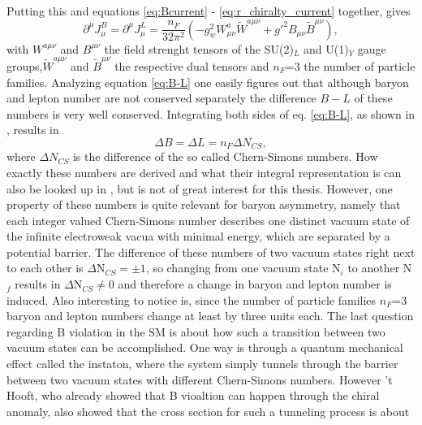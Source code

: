 Putting this and equations \eqref{eq:Bcurrent} - \eqref{eq:r_chiralty_current} together, gives
\begin{equation}
\partial^\mu J_\mu^B=\partial^\mu J_\mu^L=\frac{n_F}{32\pi^2}\left(-g_w^2W^a_{\mu\nu}\tilde{W}^{a\mu\nu}+g'^2B_{\mu\nu}\tilde{B}^{\mu\nu}\right),
\label{eq:B-L}
\end{equation}
with $W^{a\mu\nu}$ and $B^{\mu\nu}$ the field strenght tensors of the SU(2)$_L$ and U(1)$_Y$ gauge groups,$\tilde{W}^{a\mu\nu}$ and $\tilde{B}^{\mu\nu}$ the respective dual tensors and $n_F$=3 the number of particle families. \newline\indent
Analyzing equation \eqref{eq:B-L} one easily figures out that although baryon and lepton number are not conserved separately the difference $B-L$ of these numbers is very well conserved.
Integrating both sides of eq. \eqref{eq:B-L}, as shown in \cite[pp. 15f.]{Bernreuther:2002uj}, results in 
\begin{equation}
	\Delta B=\Delta L=n_F\Delta N_{CS},
	\label{eq:number_change}
\end{equation}
where $\Delta N_{CS}$ is the difference of the so called Chern-Simons numbers. How exactly these numbers are derived and what their integral representation is can also be looked up in \cite{Cline:2006ts,Petropoulos:2003pm,Bernreuther:2002uj}, but is not of great interest for this thesis. However, one property of these numbers is quite relevant for baryon asymmetry, namely that each integer valued Chern-Simons number describes one distinct vacuum state of the infinite electroweak vacua with minimal energy, which are separated by a potential barrier. The difference of these numbers of two vacuum states right next to each other is $\Delta$N$_{CS}=\pm1$, so changing from one vacuum state N$_i$ to another N$_f$ results in $\Delta$N$_{CS}\neq0$ and therefore a change in baryon and lepton number is induced. Also interesting to notice is, since the number of particle families $n_F$=3 baryon and lepton numbers change at least by three units each. \newline\indent
The last question regarding B violation in the SM is about how such a transition between two vacuum states can be accomplished. One way is through a quantum mechanical effect called the instaton, where the system simply tunnels through the barrier between two vacuum states with different Chern-Simons numbers. However 't Hooft, who already showed that B vioaltion can happen through the chiral anomaly, also showed  \cite[p. 18]{Bernreuther:2002uj} that the cross section for such a tunneling process is about 
